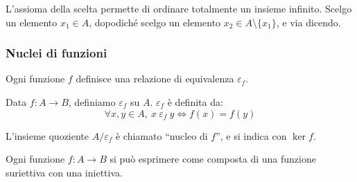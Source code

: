 L'assioma della scelta permette di ordinare totalmente un insieme infinito. Scelgo un elemento $x_1 \in A$, dopodich\'e scelgo un elemento $x_2 \in A \setminus \{x_1\}$, e via dicendo.

\subsubsection{Nuclei di funzioni}

Ogni funzione $f$ definisce una relazione di equivalenza $\varepsilon_f$. 

\begin{defn}
Data $f : A \to B$, definiamo $\varepsilon_f$ su $A$. $\varepsilon_f$ \`e definita da:
\[
\forall x, y \in A , \ x \ \varepsilon_f \ y \iff f(x) = f(y)
\]
\end{defn}

\begin{defn}
L'insieme quoziente $A / \varepsilon_f$ \`e chiamato ``nucleo di $f$'', e si indica con $\ker f$.
\end{defn}

\begin{prop}
Ogni funzione $f : A \to B$ si pu\`o esprimere come composta di una funzione suriettiva con una iniettiva.
\end{prop}

